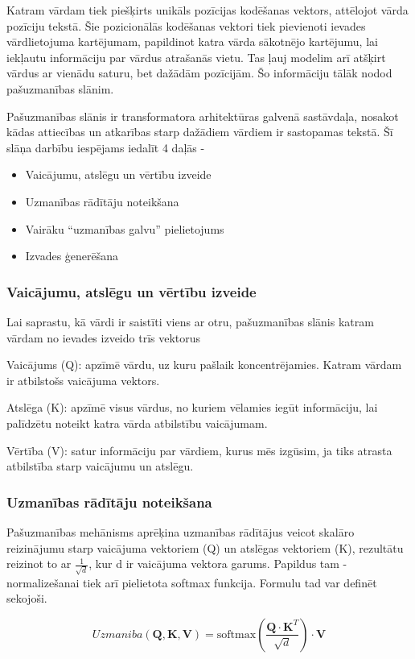 Katram vārdam tiek piešķirts unikāls pozīcijas  kodēšanas vektors, attēlojot vārda pozīciju tekstā. Šie pozicionālās kodēšanas vektori tiek pievienoti ievades vārdlietojuma kartējumam, papildinot katra vārda sākotnējo kartējumu, lai iekļautu informāciju par vārdus atrašanās vietu. Tas ļauj modelim arī atšķirt vārdus ar vienādu saturu, bet dažādām pozīcijām. Šo informāciju tālāk nodod pašuzmanības slānim.

Pašuzmanības slānis ir transformatora arhitektūras galvenā sastāvdaļa, nosakot kādas attiecības un atkarības starp dažādiem vārdiem ir sastopamas tekstā. Šī slāņa darbību iespējams iedalīt 4 daļās - 
\begin{itemize}
\item Vaicājumu, atslēgu un vērtību izveide
\item Uzmanības rādītāju noteikšana
\item Vairāku “uzmanības galvu” pielietojums
\item Izvades ģenerēšana
\end{itemize}

\subsubsection{Vaicājumu, atslēgu un vērtību izveide}
Lai saprastu, kā vārdi ir saistīti viens ar otru, pašuzmanības slānis katram vārdam no ievades izveido trīs vektorus

Vaicājums (Q): apzīmē vārdu, uz kuru pašlaik koncentrējamies. Katram vārdam ir atbilstošs vaicājuma vektors.

Atslēga (K): apzīmē visus vārdus, no kuriem vēlamies iegūt informāciju, lai palīdzētu noteikt katra vārda atbilstību vaicājumam.

Vērtība (V): satur informāciju par vārdiem, kurus mēs izgūsim, ja tiks atrasta atbilstība starp vaicājumu un atslēgu.

\subsubsection{Uzmanības rādītāju noteikšana}

Pašuzmanības mehānisms aprēķina uzmanības rādītājus veicot skalāro reizinājumu starp vaicājuma vektoriem (Q) un atslēgas vektoriem (K), rezultātu reizinot to ar \(\frac{1}{\sqrt{d}}\), kur d ir vaicājuma vektora garums. Papildus tam - normalizešanai tiek arī pielietota softmax funkcija. Formulu tad var definēt sekojoši.

\begin{equation}
Uzmaniba(\mathbf{Q}, \mathbf{K}, \mathbf{V}) = \text{softmax}\left(\frac{\mathbf{Q} \cdot \mathbf{K}^T}{\sqrt{d}}\right) \cdot \mathbf{V}
\end{equation}

